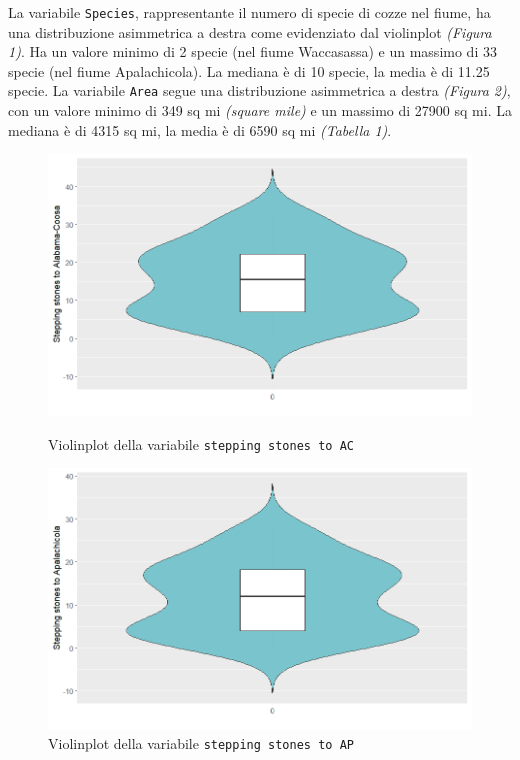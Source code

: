 \documentclass{article} %
\begin{document}
La variabile \texttt{Species}, rappresentante il numero di specie di cozze nel fiume, ha una distribuzione asimmetrica a destra come evidenziato dal violinplot \textit{(Figura 1)}. Ha un valore minimo di 2 specie (nel fiume Waccasassa) e un massimo di 33 specie (nel fiume Apalachicola). La mediana è di 10 specie, la media è di 11.25 specie.
La variabile \texttt{Area} segue una distribuzione asimmetrica a destra \textit{(Figura 2)}, con un valore minimo di 349 sq mi \textit{(square mile)} e un massimo di 27900 sq mi. La mediana è di 4315 sq mi, la media è di 6590 sq mi \textit{(Tabella 1)}.

\begin{figure}[H]
    \centering
    \begin{minipage}{0.49\textwidth}
        \centering
        \includegraphics[width=\textwidth]{immagini/vp_ac.png}
        \captionsetup{justification=centering}
        \caption{Violinplot della variabile \texttt{stepping stones to AC}}
    \end{minipage}
    \hfill
    \begin{minipage}{0.49\textwidth}
        \centering
        \includegraphics[width=\textwidth]{immagini/vp_ap.png}
        \captionsetup{justification=centering}
        \caption{Violinplot della variabile \texttt{stepping stones to AP}}
    \end{minipage}
\end{figure}
\end{document}
